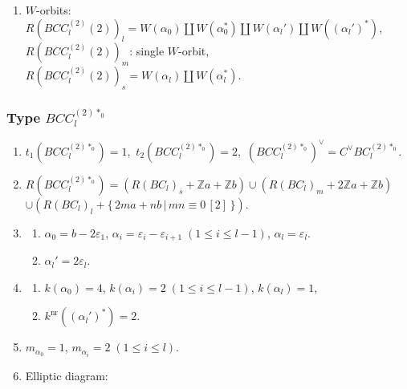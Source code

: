 \documentclass[11pt]{amsart}
\newcommand{\Z}{\mathbb{Z}}
\newcommand{\nr}{\mathrm{nr}}
\newcommand{\vep}{\varepsilon}
\begin{document}
{\begin{enumerate}
\begin{center}
{}
\end{center}
\item $W$-orbits: $R(BCC_l^{(2)}(2))_l=W(\alpha_0) \amalg W(\alpha_0^\ast)
\amalg W(\alpha_l') \amalg W((\alpha_l')^\ast)$, \\
\phantom{$W$-orbits:} $R(BCC_l^{(2)}(2))_m$: single $W$-orbit, \\
\phantom{$W$-orbits:} $R(BCC_l^{(2)}(2))_s=W(\alpha_l) \amalg W(\alpha_l^\ast)$.
\end{enumerate}

\subsubsection{Type $BCC_l^{(2)\ast_0}$} \label{data:BCC-6}
\begin{enumerate}
\item $t_1(BCC_l^{(2)\ast_0})=1,$ \quad $t_2(BCC_l^{(2)\ast_0})=2,$ \quad 
$(BCC_l^{(2)\ast_0})^\vee = C^\vee BC_l^{(2)\ast_0}.$
\item $R(BCC_l^{(2)\ast_0})=(R(BC_l)_s+\Z a+\Z b) \cup (R(BC_l)_m+2\Z a+\Z b)$ \\
 $\cup (R(BC_l)_l+\{\, 2ma+nb\, \vert\, mn 
\equiv 0\, [2]\, \})$. 
\item 
\begin{enumerate}
\item[i)] $\alpha_0=b-2\vep_1$, $\alpha_i=\vep_i-\vep_{i+1}\; 
(1\leq i\leq l-1)$, 
$\alpha_l=\vep_l$. 
\item[ii)] $\alpha_l'=2\vep_l$.
\end{enumerate}
\item 
\begin{enumerate}
\item[i)] $k(\alpha_0)=4$, \; $k(\alpha_i)=2\; (1\leq i\leq l-1)$, \; 
$k(\alpha_l)=1$, 
\item[ii)] $k^{\nr}((\alpha_l')^\ast)=2$.
\end{enumerate}
\item $m_{\alpha_0}=1$, \; $m_{\alpha_i}=2\; (1\leq i\leq l)$.
\item Elliptic diagram:





\end{enumerate}}
\end{document}
